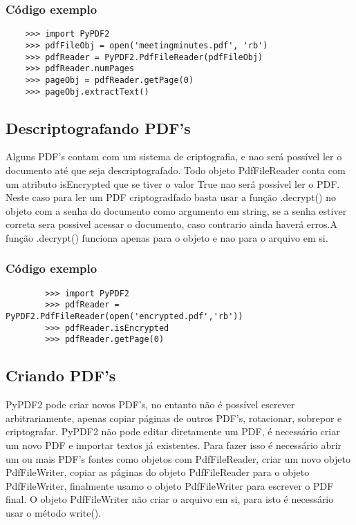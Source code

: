 \documentclass[12pt,a4paper,article]{report}
\begin{document}
\subsubsection{Código exemplo}
    \begin{verbatim}
    >>> import PyPDF2 
    >>> pdfFileObj = open('meetingminutes.pdf', 'rb') 
    >>> pdfReader = PyPDF2.PdfFileReader(pdfFileObj)
    >>> pdfReader.numPages 
    >>> pageObj = pdfReader.getPage(0)
    >>> pageObj.extractText()
    \end{verbatim}
     
\subsection{Descriptografando PDF's}
    Alguns PDF's contam com um sistema de criptografia, e nao será possível ler o documento até que seja descriptografado. Todo objeto PdfFileReader conta com um atributo isEncrypted que se tiver o valor True nao será possível ler o PDF. Neste caso para ler um PDF criptogradfado basta usar a função .decrypt() no objeto com a senha do documento como argumento em string, se a senha estiver correta sera possivel acessar o documento, caso contrario ainda haverá erros.A função .decrypt() funciona apenas para o objeto e nao para o arquivo em si.
    
\subsubsection{Código exemplo}
    \begin{verbatim}
        >>> import PyPDF2 
        >>> pdfReader = PyPDF2.PdfFileReader(open('encrypted.pdf','rb'))
        >>> pdfReader.isEncrypted 
        >>> pdfReader.getPage(0)
    \end{verbatim}
    
\subsection{Criando PDF's}
    PyPDF2 pode criar novos PDF's, no entanto não é possível escrever arbitrariamente, apenas copiar páginas de outros PDF's, rotacionar, sobrepor e criptografar.
    PyPDF2 não pode editar diretamente um PDF, é necessário criar um novo PDF e importar textos já existentes.
    Para fazer isso é necessário abrir um ou mais PDF's  fontes como objetos com PdfFileReader, criar um novo objeto PdfFileWriter, copiar as páginas do objeto PdfFileReader para o objeto PdfFileWriter, finalmente usamo o objeto PdfFileWriter para escrever o PDF final.
    O objeto PdfFileWriter não criar o arquivo em si, para isto é necessário usar o método write().
    
\end{document}

